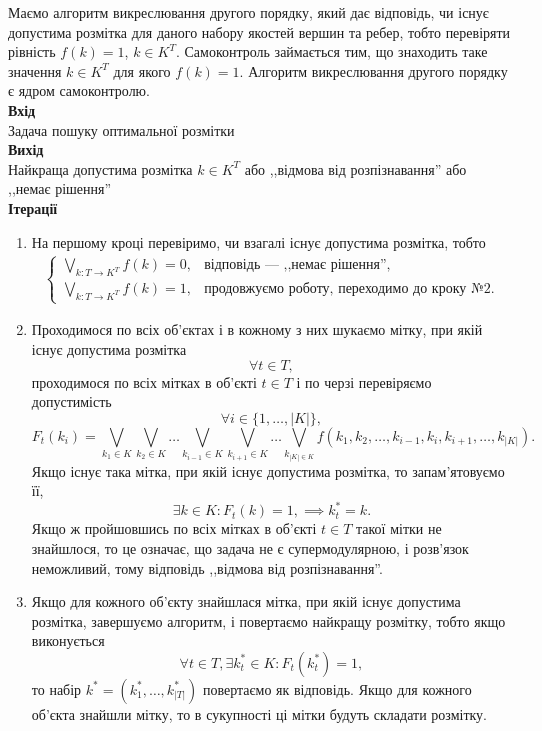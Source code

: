 Маємо алгоритм викреслювання другого порядку, який дає відповідь, чи існує
допустима розмітка для даного набору якостей вершин та ребер, 
тобто перевіряти рівність $f(k)=1$, $k\in K^T$. Самоконтроль займається тим, що
знаходить таке значення $k\in K^T$ для якого $f(k)=1$. Алгоритм викреслювання 
другого порядку є ядром самоконтролю.\\
\textbf{Вхід} \\
Задача пошуку оптимальної розмітки\\
\textbf{Вихід}\\
 Найкраща допустима розмітка $k\in K^T$ або ,,відмова від розпізнавання''
або ,,немає рішення''\\
\textbf{Ітерації}
\begin{enumerate}
    \item На першому кроці перевіримо, чи взагалі існує допустима розмітка, тобто
    \begin{equation*}
    \begin{aligned}
    \begin{cases}
        \bigvee_{k:T\rightarrow K^T}f(k)=0, & \text{відповідь --- ,,немає рішення''},\\
        \bigvee_{k:T\rightarrow K^T}f(k)=1, & \text{продовжуємо роботу, переходимо до кроку №2.}
    \end{cases}
\end{aligned}
\end{equation*}
\item Проходимося по всіх об'єктах і в кожному з них шукаємо мітку, при якій існує допустима розмітка
\begin{equation*}
    \forall t \in T,
\end{equation*}
проходимося по всіх мітках в об'єкті $t\in T$ і по черзі перевіряємо допустимість
\begin{equation*}
    \forall i \in \{1,\dots, |K|\},
\end{equation*}
\begin{equation*}
    F_t(k_i) = \bigvee_{k_1\in K}\bigvee_{k_2\in K}\dots\bigvee_{k_{i-1}\in K}
    \bigvee_{k_{i+1}\in K}\dots\bigvee_{k_{|K|\in K}} f(k_1, k_2, \dots, k_{i-1}, k_i, k_{i+1},\dots,k_{|K|}).
\end{equation*}
Якщо існує така мітка, при якій існує допустима розмітка, то запам'ятовуємо її,
\begin{equation*}
   \exists k\in K: F_t(k)=1,\implies k^*_t = k.
\end{equation*}
Якщо ж пройшовшись по всіх мітках в об'єкті $t\in T$ такої мітки не знайшлося, то це
означає, що задача не є супермодулярною, і розв’язок неможливий, тому відповідь 
,,відмова від розпізнавання''.
\item Якщо для кожного об'єкту знайшлася мітка, при якій існує допустима розмітка, 
завершуємо алгоритм, і повертаємо найкращу розмітку, тобто якщо виконується
\begin{equation*}
    \forall t\in T,  \exists k^*_t\in K: F_t(k^*_t)=1, 
\end{equation*}
то набір $k^*=(k^*_1, \dots, k^*_{|T|})$ повертаємо як відповідь.
Якщо для кожного об'єкта знайшли мітку, то в сукупності ці мітки будуть складати розмітку.
\end{enumerate}